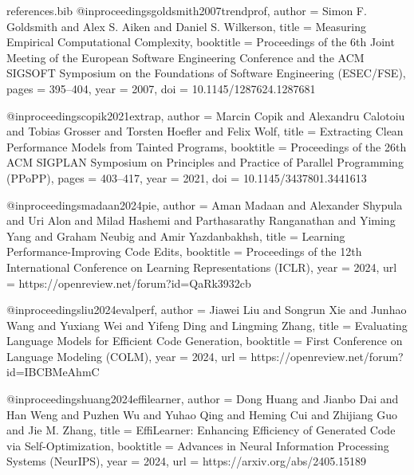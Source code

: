 \begin{filecontents*}{references.bib}
@inproceedings{goldsmith2007trendprof,
  author    = {Simon F. Goldsmith and Alex S. Aiken and Daniel S. Wilkerson},
  title     = {{Measuring Empirical Computational Complexity}},
  booktitle = {Proceedings of the 6th Joint Meeting of the European Software Engineering Conference and the ACM SIGSOFT Symposium on the Foundations of Software Engineering (ESEC/FSE)},
  pages     = {395--404},
  year      = {2007},
  doi       = {10.1145/1287624.1287681}
}

@inproceedings{copik2021extrap,
  author    = {Marcin Copik and Alexandru Calotoiu and Tobias Grosser and Torsten Hoefler and Felix Wolf},
  title     = {{Extracting Clean Performance Models from Tainted Programs}},
  booktitle = {Proceedings of the 26th ACM SIGPLAN Symposium on Principles and Practice of Parallel Programming (PPoPP)},
  pages     = {403--417},
  year      = {2021},
  doi       = {10.1145/3437801.3441613}
}

@inproceedings{madaan2024pie,
  author    = {Aman Madaan and Alexander Shypula and Uri Alon and Milad Hashemi and Parthasarathy Ranganathan and Yiming Yang and Graham Neubig and Amir Yazdanbakhsh},
  title     = {{Learning Performance-Improving Code Edits}},
  booktitle = {Proceedings of the 12th International Conference on Learning Representations (ICLR)},
  year      = {2024},
  url       = {https://openreview.net/forum?id=QaRk3932cb}
}

@inproceedings{liu2024evalperf,
  author    = {Jiawei Liu and Songrun Xie and Junhao Wang and Yuxiang Wei and Yifeng Ding and Lingming Zhang},
  title     = {{Evaluating Language Models for Efficient Code Generation}},
  booktitle = {First Conference on Language Modeling (COLM)},
  year      = {2024},
  url       = {https://openreview.net/forum?id=IBCBMeAhmC}
}

@inproceedings{huang2024effilearner,
  author    = {Dong Huang and Jianbo Dai and Han Weng and Puzhen Wu and Yuhao Qing and Heming Cui and Zhijiang Guo and Jie M. Zhang},
  title     = {{EffiLearner: Enhancing Efficiency of Generated Code via Self-Optimization}},
  booktitle = {Advances in Neural Information Processing Systems (NeurIPS)},
  year      = {2024},
  url       = {https://arxiv.org/abs/2405.15189}
}


\end{filecontents*}

